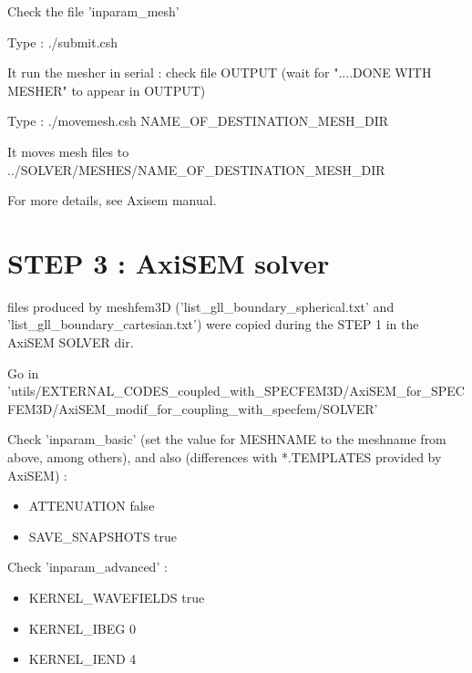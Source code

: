 \documentclass[11pt]{article}
\begin{document}
\medskip

\noindent Check the file 'inparam\_mesh'

\medskip

\noindent Type : ./submit.csh

\medskip

\noindent It run the mesher in serial : check file OUTPUT (wait for "....DONE WITH MESHER" to appear in OUTPUT)

\medskip

\noindent Type : ./movemesh.csh NAME\_OF\_DESTINATION\_MESH\_DIR

\medskip

\noindent It moves mesh files to ../SOLVER/MESHES/NAME\_OF\_DESTINATION\_MESH\_DIR

\medskip

\noindent For more details, see Axisem manual.

\section{STEP 3 : AxiSEM solver}

 files produced by meshfem3D ('list\_gll\_boundary\_spherical.txt' and 'list\_gll\_boundary\_cartesian.txt') were copied during the STEP 1 in the AxiSEM SOLVER dir.

\medskip

\noindent Go in {\scriptsize 'utils/EXTERNAL\_CODES\_coupled\_with\_SPECFEM3D/AxiSEM\_for\_SPECFEM3D/AxiSEM\_modif\_for\_coupling\_with\_specfem/SOLVER'}

\medskip

\noindent Check 'inparam\_basic' (set the value for MESHNAME to the meshname from above, among others), and also (differences with *.TEMPLATES provided
by AxiSEM) :

\begin{itemize}

\item[\textbullet] ATTENUATION         false
\item[\textbullet] SAVE\_SNAPSHOTS     true

\end{itemize}

\medskip

\noindent Check 'inparam\_advanced' :

\begin{itemize}

\item[\textbullet] KERNEL\_WAVEFIELDS   true
\item[\textbullet] KERNEL\_IBEG         0
\item[\textbullet] KERNEL\_IEND         4

\end{itemize}
\end{document}
